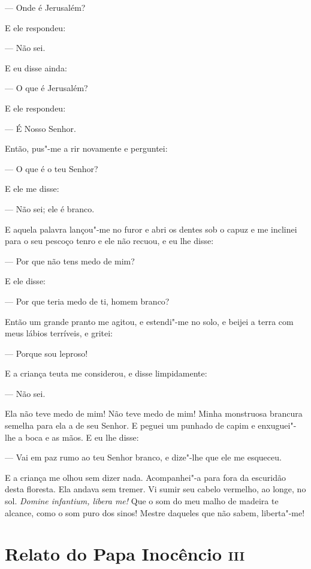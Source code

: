 --- Onde é Jerusalém?

E ele respondeu:

--- Não sei.

E eu disse ainda:

--- O que é Jerusalém?

E ele respondeu:

--- É Nosso Senhor.

Então, pus"-me a rir novamente e perguntei:

--- O que é o teu Senhor?

E ele me disse:

--- Não sei; ele é branco.

E aquela palavra lançou"-me no furor e abri os dentes sob o capuz e me
inclinei para o seu pescoço tenro e ele não recuou, e eu lhe disse:

--- Por que não tens medo de mim?

E ele disse:

--- Por que teria medo de ti, homem branco?

Então um grande pranto me agitou, e estendi"-me no solo, e beijei a terra
com meus lábios terríveis, e gritei:

--- Porque sou leproso!

E a criança teuta me considerou, e disse limpidamente:

--- Não sei.

Ela não teve medo de mim! Não teve medo de mim! Minha monstruosa brancura
semelha para ela a de seu Senhor. E peguei um punhado de capim e
enxuguei"-lhe a boca e as mãos. E eu lhe disse:

--- Vai em paz rumo ao teu Senhor branco, e dize"-lhe que ele me esqueceu.

E a criança me olhou sem dizer nada. Acompanhei"-a para fora da escuridão
desta floresta. Ela andava sem tremer. Vi sumir seu cabelo vermelho, ao
longe, no sol. \textit{Domine infantium, libera me!}  Que o som
do meu malho de madeira te alcance, como o som puro dos sinos! Mestre
daqueles que não sabem, liberta"-me!

\chapter{Relato do Papa Inocêncio \textsc{iii}}

